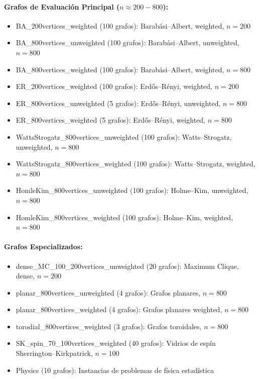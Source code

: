 \documentclass{article}
\begin{document}
\paragraph{Grafos de Evaluación Principal ($n \approx 200-800$):}
\begin{itemize}
    \item BA\_200vertices\_weighted (100 grafos): Barabási–Albert, weighted, $n=200$
    \item BA\_800vertices\_unweighted (100 grafos): Barabási–Albert, unweighted, $n=800$
    \item BA\_800vertices\_weighted (100 grafos): Barabási–Albert, weighted, $n=800$
    \item ER\_200vertices\_weighted (100 grafos): Erdős–Rényi, weighted, $n=200$
    \item ER\_800vertices\_unweighted (5 grafos): Erdős–Rényi, unweighted, $n=800$
    \item ER\_800vertices\_weighted (5 grafos): Erdős–Rényi, weighted, $n=800$
    \item WattsStrogatz\_800vertices\_unweighted (100 grafos): Watts–Strogatz, unweighted, $n=800$
    \item WattsStrogatz\_800vertices\_weighted (100 grafos): Watts–Strogatz, weighted, $n=800$
    \item HomleKim\_800vertices\_unweighted (100 grafos): Holme–Kim, unweighted, $n=800$
    \item HomleKim\_800vertices\_weighted (100 grafos): Holme–Kim, weighted, $n=800$
\end{itemize}

\paragraph{Grafos Especializados:}
\begin{itemize}
    \item dense\_MC\_100\_200vertices\_unweighted (20 grafos): Maximum Clique, dense, $n=200$
    \item planar\_800vertices\_unweighted (4 grafos): Grafos planares, $n=800$
    \item planar\_800vertices\_weighted (4 grafos): Grafos planares weighted, $n=800$
    \item torodial\_800vertices\_weighted (3 grafos): Grafos toroidales, $n=800$
    \item SK\_spin\_70\_100vertices\_weighted (40 grafos): Vidrios de espín Sherrington–Kirkpatrick, $n=100$
    \item Physics (10 grafos): Instancias de problemas de física estadística
\end{itemize}
\end{document}
